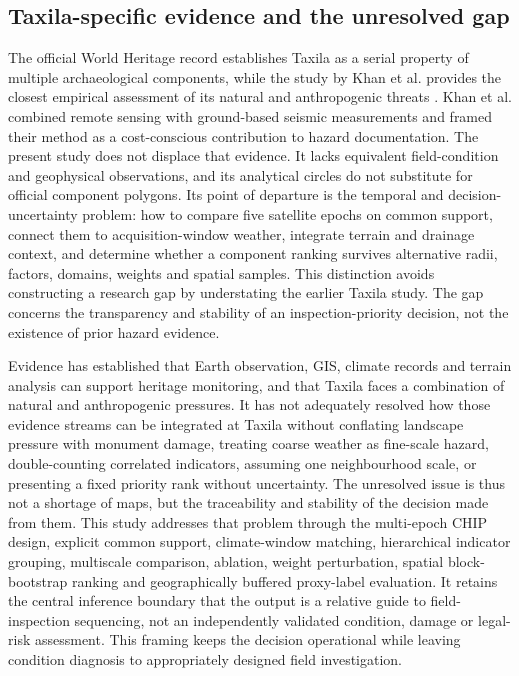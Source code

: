 \subsection{Taxila-specific evidence and the unresolved gap}

The official World Heritage record establishes Taxila as a serial property of multiple archaeological components, while the study by Khan et al. provides the closest empirical assessment of its natural and anthropogenic threats \citep{unesco_taxila,khan2022taxila}. Khan et al. combined remote sensing with ground-based seismic measurements and framed their method as a cost-conscious contribution to hazard documentation. The present study does not displace that evidence. It lacks equivalent field-condition and geophysical observations, and its analytical circles do not substitute for official component polygons. Its point of departure is the temporal and decision-uncertainty problem: how to compare five satellite epochs on common support, connect them to acquisition-window weather, integrate terrain and drainage context, and determine whether a component ranking survives alternative radii, factors, domains, weights and spatial samples. This distinction avoids constructing a research gap by understating the earlier Taxila study. The gap concerns the transparency and stability of an inspection-priority decision, not the existence of prior hazard evidence.

Evidence has established that Earth observation, GIS, climate records and terrain analysis can support heritage monitoring, and that Taxila faces a combination of natural and anthropogenic pressures. It has not adequately resolved how those evidence streams can be integrated at Taxila without conflating landscape pressure with monument damage, treating coarse weather as fine-scale hazard, double-counting correlated indicators, assuming one neighbourhood scale, or presenting a fixed priority rank without uncertainty. The unresolved issue is thus not a shortage of maps, but the traceability and stability of the decision made from them. This study addresses that problem through the multi-epoch CHIP design, explicit common support, climate-window matching, hierarchical indicator grouping, multiscale comparison, ablation, weight perturbation, spatial block-bootstrap ranking and geographically buffered proxy-label evaluation. It retains the central inference boundary that the output is a relative guide to field-inspection sequencing, not an independently validated condition, damage or legal-risk assessment. This framing keeps the decision operational while leaving condition diagnosis to appropriately designed field investigation.
